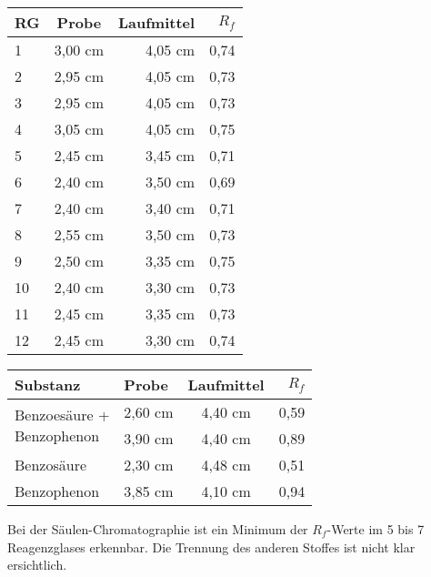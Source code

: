 \documentclass[10pt]{scrartcl}
\begin{document}
\begin{minipage}{.45\textwidth}
\begin{tabular}{l c r r}
	RG & Probe & Laufmittel & $R_f$ \\ \hline
	1 & 3,00 cm & 4,05 cm & 0,74\\
	2 & 2,95 cm & 4,05 cm & 0,73\\
	3 & 2,95 cm & 4,05 cm & 0,73\\
	4 & 3,05 cm & 4,05 cm & 0,75\\
	5 & 2,45 cm & 3,45 cm & 0,71\\
	6 & 2,40 cm & 3,50 cm & 0,69\\
	7 & 2,40 cm & 3,40 cm & 0,71\\
	8 & 2,55 cm & 3,50 cm & 0,73\\
	9 & 2,50 cm & 3,35 cm & 0,75\\
	10 & 2,40 cm & 3,30 cm & 0,73\\
	11 & 2,45 cm & 3,35 cm & 0,73\\
	12 & 2,45 cm & 3,30 cm & 0,74 
\end{tabular}
\end{minipage}
\begin{minipage}{.45\textwidth}
	\begin{tabular}{l l c r}
		Substanz & Probe & Laufmittel & $R_f$ \\ \hline \hline
		\multirow{2}{*}{\parbox[t]{3cm}{Benzoesäure +\\ Benzophenon}} & 2,60 cm & 4,40 cm & 0,59\\
							   & 3,90 cm & 4,40 cm & 0,89\\ \hline
		Benzosäure & 2,30 cm & 4,48 cm & 0,51\\
		Benzophenon & 3,85 cm & 4,10 cm & 0,94  
	\end{tabular}
\end{minipage}
\vspace{5mm}

Bei der Säulen-Chromatographie ist ein Minimum der $R_f$-Werte im 5 bis 7 Reagenzglases erkennbar. Die Trennung des anderen Stoffes ist nicht klar ersichtlich. 
\end{document}
